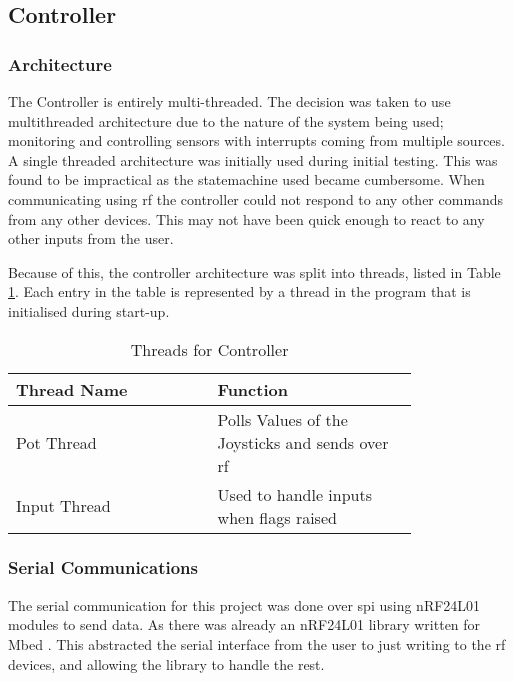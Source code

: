 \documentclass [11pt]{article}
\begin{document}
\subsection{Controller}
\subsubsection{Architecture}


The Controller is entirely multi-threaded. The decision was taken to use  multithreaded architecture due to the nature of the system being used; monitoring and controlling sensors with interrupts coming from multiple sources. A single threaded architecture was initially used during initial testing. This was found to be impractical as the statemachine used became cumbersome. When communicating using \gls{rf} the controller could not respond to any other commands from any other devices. This may not have been quick enough to react to any other inputs from the user. 

Because of this, the controller architecture was split into threads, listed in Table \ref{table:threads_for_controller}. Each entry in the table is represented by a thread in the program that is initialised during start-up. 

\begin{table}[H]
\centering
\setlength{\arrayrulewidth}{1.5pt}
\begin{tabular}{|p{0.4\linewidth}|p{0.4\linewidth}|}
\hline
\cellcolor{gray!40}Thread Name & \cellcolor{gray!40}Function \\ 
\hline
\cellcolor{gray!20}Pot Thread & \cellcolor{gray!20}Polls Values of the Joysticks and sends over \gls{rf}\\
\hline
\cellcolor{gray!20}Input Thread & \cellcolor{gray!20}Used to handle inputs when flags raised\\
\hline
\end{tabular}
\caption{Threads for Controller}
\label{table:threads_for_controller}
\end{table}

\subsubsection{Serial Communications}\label{sec:serial_communication_1}
The serial communication for this project was done over \gls{spi} using nRF24L01 modules to send data. As there was already an nRF24L01 library written for Mbed \cite{nRF24L01_lib_ref}. This abstracted the serial interface from the user to just writing to the \gls{rf} devices, and allowing the library to handle the rest. 
\end{document}
